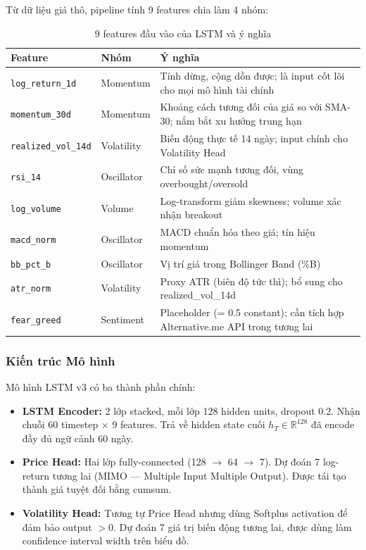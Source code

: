 \documentclass[12pt, a4paper]{article}
\begin{document}
Từ dữ liệu giá thô, pipeline tính 9 features chia làm 4 nhóm:

\begin{table}[H]
  \centering
  \caption{9 features đầu vào của LSTM và ý nghĩa}
  \label{tab:features}
  \begin{tabularx}{\textwidth}{llX}
    \toprule
    Feature & Nhóm & Ý nghĩa \\
    \midrule
    \texttt{log\_return\_1d} & Momentum & Tính dừng, cộng dồn được; là input
      cốt lõi cho mọi mô hình tài chính \\
    \texttt{momentum\_30d} & Momentum & Khoảng cách tương đối của giá so với SMA-30;
      nắm bắt xu hướng trung hạn \\
    \texttt{realized\_vol\_14d} & Volatility & Biến động thực tế 14 ngày; input
      chính cho Volatility Head \\
    \texttt{rsi\_14} & Oscillator & Chỉ số sức mạnh tương đối, vùng overbought/oversold \\
    \texttt{log\_volume} & Volume & Log-transform giảm skewness; volume xác nhận breakout \\
    \texttt{macd\_norm} & Oscillator & MACD chuẩn hóa theo giá; tín hiệu momentum \\
    \texttt{bb\_pct\_b} & Oscillator & Vị trí giá trong Bollinger Band (\%B) \\
    \texttt{atr\_norm} & Volatility & Proxy ATR (biên độ tức thì); bổ sung cho
      realized\_vol\_14d \\
    \texttt{fear\_greed} & Sentiment & Placeholder (= 0.5 constant); cần tích hợp
      Alternative.me API trong tương lai \\
    \bottomrule
  \end{tabularx}
\end{table}

\subsubsection{Kiến trúc Mô hình}

Mô hình LSTM v3 có ba thành phần chính:

\begin{itemize}
  \item \textbf{LSTM Encoder:} 2 lớp stacked, mỗi lớp 128 hidden units, dropout 0.2.
    Nhận chuỗi 60 timestep $\times$ 9 features. Trả về hidden state cuối $h_T \in
    \mathbb{R}^{128}$ đã encode đầy đủ ngữ cảnh 60 ngày.

  \item \textbf{Price Head:} Hai lớp fully-connected (128 $\to$ 64 $\to$ 7). Dự đoán
    7 log-return tương lai (MIMO --- Multiple Input Multiple Output). Được tái tạo
    thành giá tuyệt đối bằng cumsum.

  \item \textbf{Volatility Head:} Tương tự Price Head nhưng dùng Softplus activation
    để đảm bảo output $> 0$. Dự đoán 7 giá trị biến động tương lai, được dùng làm
    confidence interval width trên biểu đồ.
\end{itemize}
\end{document}
